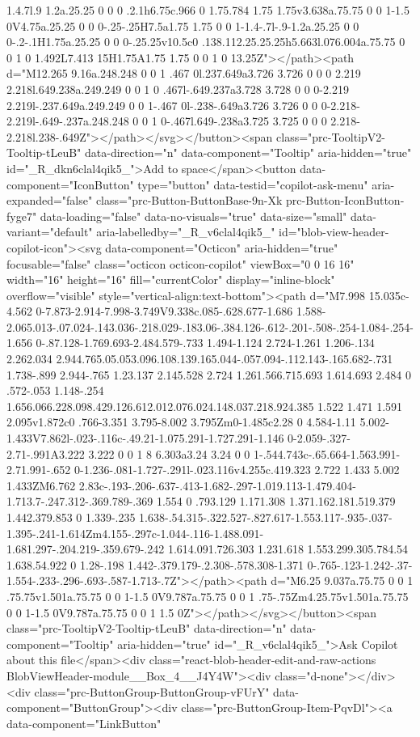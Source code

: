 {{{{{{{1.4.7l.9 1.2a.25.25 0 0 0 .2.1h6.75c.966 0 1.75.784 1.75 1.75v3.638a.75.75 0 0 1-1.5 0V4.75a.25.25 0 0 0-.25-.25H7.5a1.75 1.75 0 0 1-1.4-.7l-.9-1.2a.25.25 0 0 0-.2-.1H1.75a.25.25 0 0 0-.25.25v10.5c0 .138.112.25.25.25h5.663l.076.004a.75.75 0 0 1 0 1.492L7.413 15H1.75A1.75 1.75 0 0 1 0 13.25Z"></path><path d="M12.265 9.16a.248.248 0 0 1 .467 0l.237.649a3.726 3.726 0 0 0 2.219 2.218l.649.238a.249.249 0 0 1 0 .467l-.649.237a3.728 3.728 0 0 0-2.219 2.219l-.237.649a.249.249 0 0 1-.467 0l-.238-.649a3.726 3.726 0 0 0-2.218-2.219l-.649-.237a.248.248 0 0 1 0-.467l.649-.238a3.725 3.725 0 0 0 2.218-2.218l.238-.649Z"></path></svg></button><span class="prc-TooltipV2-Tooltip-tLeuB" data-direction="n" data-component="Tooltip" aria-hidden="true" id="_R_dkn6clal4qik5_">Add to space</span><button data-component="IconButton" type="button" data-testid="copilot-ask-menu" aria-expanded="false" class="prc-Button-ButtonBase-9n-Xk prc-Button-IconButton-fyge7" data-loading="false" data-no-visuals="true" data-size="small" data-variant="default" aria-labelledby="_R_v6clal4qik5_" id="blob-view-header-copilot-icon"><svg data-component="Octicon" aria-hidden="true" focusable="false" class="octicon octicon-copilot" viewBox="0 0 16 16" width="16" height="16" fill="currentColor" display="inline-block" overflow="visible" style="vertical-align:text-bottom"><path d="M7.998 15.035c-4.562 0-7.873-2.914-7.998-3.749V9.338c.085-.628.677-1.686 1.588-2.065.013-.07.024-.143.036-.218.029-.183.06-.384.126-.612-.201-.508-.254-1.084-.254-1.656 0-.87.128-1.769.693-2.484.579-.733 1.494-1.124 2.724-1.261 1.206-.134 2.262.034 2.944.765.05.053.096.108.139.165.044-.057.094-.112.143-.165.682-.731 1.738-.899 2.944-.765 1.23.137 2.145.528 2.724 1.261.566.715.693 1.614.693 2.484 0 .572-.053 1.148-.254 1.656.066.228.098.429.126.612.012.076.024.148.037.218.924.385 1.522 1.471 1.591 2.095v1.872c0 .766-3.351 3.795-8.002 3.795Zm0-1.485c2.28 0 4.584-1.11 5.002-1.433V7.862l-.023-.116c-.49.21-1.075.291-1.727.291-1.146 0-2.059-.327-2.71-.991A3.222 3.222 0 0 1 8 6.303a3.24 3.24 0 0 1-.544.743c-.65.664-1.563.991-2.71.991-.652 0-1.236-.081-1.727-.291l-.023.116v4.255c.419.323 2.722 1.433 5.002 1.433ZM6.762 2.83c-.193-.206-.637-.413-1.682-.297-1.019.113-1.479.404-1.713.7-.247.312-.369.789-.369 1.554 0 .793.129 1.171.308 1.371.162.181.519.379 1.442.379.853 0 1.339-.235 1.638-.54.315-.322.527-.827.617-1.553.117-.935-.037-1.395-.241-1.614Zm4.155-.297c-1.044-.116-1.488.091-1.681.297-.204.219-.359.679-.242 1.614.091.726.303 1.231.618 1.553.299.305.784.54 1.638.54.922 0 1.28-.198 1.442-.379.179-.2.308-.578.308-1.371 0-.765-.123-1.242-.37-1.554-.233-.296-.693-.587-1.713-.7Z"></path><path d="M6.25 9.037a.75.75 0 0 1 .75.75v1.501a.75.75 0 0 1-1.5 0V9.787a.75.75 0 0 1 .75-.75Zm4.25.75v1.501a.75.75 0 0 1-1.5 0V9.787a.75.75 0 0 1 1.5 0Z"></path></svg></button><span class="prc-TooltipV2-Tooltip-tLeuB" data-direction="n" data-component="Tooltip" aria-hidden="true" id="_R_v6clal4qik5_">Ask Copilot about this file</span><div class="react-blob-header-edit-and-raw-actions BlobViewHeader-module__Box_4__J4Y4W"><div class="d-none"></div><div class="prc-ButtonGroup-ButtonGroup-vFUrY" data-component="ButtonGroup"><div class="prc-ButtonGroup-Item-PqvDl"><a data-component="LinkButton" }}}}}}}
